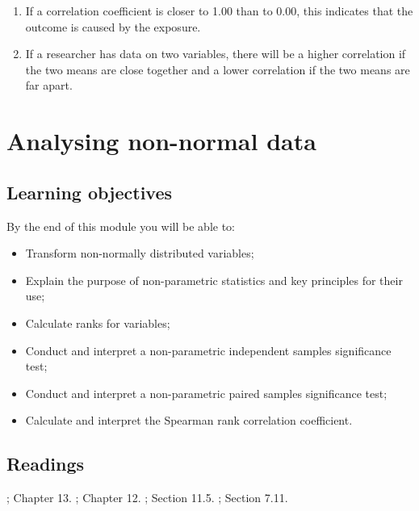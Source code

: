 \documentclass[
]{memoir}
\providecommand{\tightlist}{%
  \setlength{\itemsep}{0pt}\setlength{\parskip}{0pt}}
\begin{document}
\begin{enumerate}
\def\labelenumi{\alph{enumi})}
\tightlist
\item
  If a correlation coefficient is closer to 1.00 than to 0.00, this indicates that the outcome is caused by the exposure.
\item
  If a researcher has data on two variables, there will be a higher correlation if the two means are close together and a lower correlation if the two means are far apart.
\end{enumerate}

\hypertarget{analysing-non-normal-data}{%
\chapter{Analysing non-normal data}\label{analysing-non-normal-data}}

\hypertarget{learning-objectives-8}{%
\section*{Learning objectives}\label{learning-objectives-8}}

By the end of this module you will be able to:

\begin{itemize}
\tightlist
\item
  Transform non-normally distributed variables;
\item
  Explain the purpose of non-parametric statistics and key principles for their use;
\item
  Calculate ranks for variables;
\item
  Conduct and interpret a non-parametric independent samples significance test;
\item
  Conduct and interpret a non-parametric paired samples significance test;
\item
  Calculate and interpret the Spearman rank correlation coefficient.
\end{itemize}

\hypertarget{readings-8}{%
\section*{Readings}\label{readings-8}}

\citet{kirkwood_sterne01}; Chapter 13.
\citet{bland15}; Chapter 12.
\citet{juul_frydenberg14}; Section 11.5.
\citet{acock10}; Section 7.11.
\end{document}
